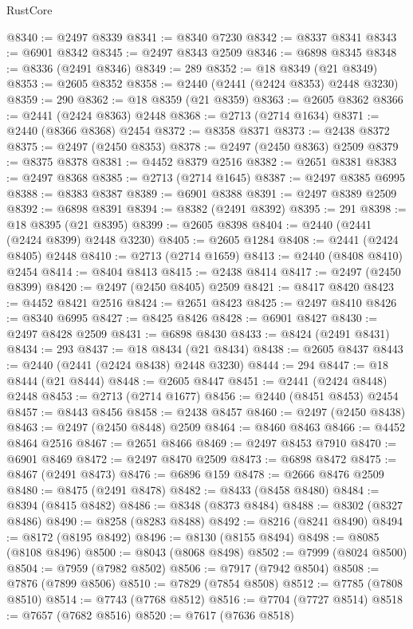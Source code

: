 \begin{lexlean}{RustCore}
\begin{coremodule}
@8340 := @2497 @8339
@8341 := @8340 @7230
@8342 := @8337 @8341
@8343 := @6901 @8342
@8345 := @2497 @8343 @2509
@8346 := @6898 @8345
@8348 := @8336 (@2491 @8346)
@8349 := 289
@8352 := @18 @8349 (@21 @8349)
@8353 := @2605 @8352
@8358 := @2440 (@2441 (@2424 @8353) @2448 @3230)
@8359 := 290
@8362 := @18 @8359 (@21 @8359)
@8363 := @2605 @8362
@8366 := @2441 (@2424 @8363) @2448
@8368 := @2713 (@2714 @1634)
@8371 := @2440 (@8366 @8368) @2454
@8372 := @8358 @8371
@8373 := @2438 @8372
@8375 := @2497 (@2450 @8353)
@8378 := @2497 (@2450 @8363) @2509
@8379 := @8375 @8378
@8381 := @4452 @8379 @2516
@8382 := @2651 @8381
@8383 := @2497 @8368
@8385 := @2713 (@2714 @1645)
@8387 := @2497 @8385 @6995
@8388 := @8383 @8387
@8389 := @6901 @8388
@8391 := @2497 @8389 @2509
@8392 := @6898 @8391
@8394 := @8382 (@2491 @8392)
@8395 := 291
@8398 := @18 @8395 (@21 @8395)
@8399 := @2605 @8398
@8404 := @2440 (@2441 (@2424 @8399) @2448 @3230)
@8405 := @2605 @1284
@8408 := @2441 (@2424 @8405) @2448
@8410 := @2713 (@2714 @1659)
@8413 := @2440 (@8408 @8410) @2454
@8414 := @8404 @8413
@8415 := @2438 @8414
@8417 := @2497 (@2450 @8399)
@8420 := @2497 (@2450 @8405) @2509
@8421 := @8417 @8420
@8423 := @4452 @8421 @2516
@8424 := @2651 @8423
@8425 := @2497 @8410
@8426 := @8340 @6995
@8427 := @8425 @8426
@8428 := @6901 @8427
@8430 := @2497 @8428 @2509
@8431 := @6898 @8430
@8433 := @8424 (@2491 @8431)
@8434 := 293
@8437 := @18 @8434 (@21 @8434)
@8438 := @2605 @8437
@8443 := @2440 (@2441 (@2424 @8438) @2448 @3230)
@8444 := 294
@8447 := @18 @8444 (@21 @8444)
@8448 := @2605 @8447
@8451 := @2441 (@2424 @8448) @2448
@8453 := @2713 (@2714 @1677)
@8456 := @2440 (@8451 @8453) @2454
@8457 := @8443 @8456
@8458 := @2438 @8457
@8460 := @2497 (@2450 @8438)
@8463 := @2497 (@2450 @8448) @2509
@8464 := @8460 @8463
@8466 := @4452 @8464 @2516
@8467 := @2651 @8466
@8469 := @2497 @8453 @7910
@8470 := @6901 @8469
@8472 := @2497 @8470 @2509
@8473 := @6898 @8472
@8475 := @8467 (@2491 @8473)
@8476 := @6896 @159
@8478 := @2666 @8476 @2509
@8480 := @8475 (@2491 @8478)
@8482 := @8433 (@8458 @8480)
@8484 := @8394 (@8415 @8482)
@8486 := @8348 (@8373 @8484)
@8488 := @8302 (@8327 @8486)
@8490 := @8258 (@8283 @8488)
@8492 := @8216 (@8241 @8490)
@8494 := @8172 (@8195 @8492)
@8496 := @8130 (@8155 @8494)
@8498 := @8085 (@8108 @8496)
@8500 := @8043 (@8068 @8498)
@8502 := @7999 (@8024 @8500)
@8504 := @7959 (@7982 @8502)
@8506 := @7917 (@7942 @8504)
@8508 := @7876 (@7899 @8506)
@8510 := @7829 (@7854 @8508)
@8512 := @7785 (@7808 @8510)
@8514 := @7743 (@7768 @8512)
@8516 := @7704 (@7727 @8514)
@8518 := @7657 (@7682 @8516)
@8520 := @7617 (@7636 @8518)

\end{coremodule}
\end{lexlean}
